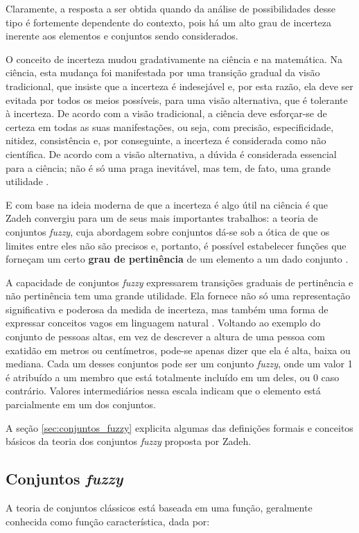 Claramente, a resposta a ser obtida quando da análise de possibilidades desse tipo é fortemente dependente do contexto, pois há um alto grau de incerteza inerente aos elementos e conjuntos sendo considerados.

O conceito de incerteza mudou gradativamente na ciência e na matemática. Na ciência, esta mudança foi manifestada por uma transição gradual da visão tradicional, que insiste que a incerteza é indesejável e, por esta razão, ela deve ser evitada por todos os meios possíveis, para uma visão alternativa, que é tolerante à incerteza. De acordo com a visão tradicional, a ciência deve esforçar-se de certeza em todas as suas manifestações, ou seja, com precisão, especificidade, nitidez, consistência e, por conseguinte, a incerteza é considerada como não científica. De acordo com a visão alternativa, a dúvida é considerada essencial para a ciência; não é só uma praga inevitável, mas tem, de fato, uma grande utilidade \citep{klir:95}.

E com base na ideia moderna de que a incerteza é algo útil na ciência é que Zadeh convergiu para um de seus mais importantes trabalhos: a teoria de conjuntos \emph{fuzzy}, cuja abordagem sobre conjuntos dá-se sob a ótica de que os limites entre eles não são precisos e, portanto, é possível estabelecer funções que forneçam um certo \textbf{grau de pertinência} de um elemento a um dado conjunto \citep{zadeh:65}.

A capacidade de conjuntos \emph{fuzzy} expressarem transições graduais de pertinência e não pertinência tem uma grande utilidade. Ela fornece não só uma representação significativa e poderosa da medida de incerteza, mas também uma forma de expressar conceitos vagos em linguagem natural \citep{klir:95}. Voltando ao exemplo do conjunto de pessoas altas, em vez de descrever a altura de uma pessoa com exatidão em metros ou centímetros, pode-se apenas dizer que ela é alta, baixa ou mediana. Cada um desses conjuntos pode ser um conjunto \emph{fuzzy}, onde um valor 1 é atribuído a um membro que está totalmente incluído em um deles, ou 0 caso contrário. Valores intermediários nessa escala indicam que o elemento está parcialmente em um dos conjuntos.

A seção \ref{sec:conjuntos_fuzzy} explicita algumas das definições formais e conceitos básicos da teoria dos conjuntos \emph{fuzzy} proposta por Zadeh.

\subsection{Conjuntos \emph{fuzzy}}
\label{sec:conjuntos_fuzzy}
A teoria de conjuntos clássicos está baseada em uma função, geralmente conhecida como função característica, dada por:

